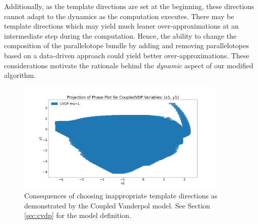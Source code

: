Additionally, as the template directions are set at the beginning, these directions cannot adapt to the dynamics as the computation executes.
%
There may be template directions which may yield much leaner over-approximations at an intermediate step during the computation.
%
Hence, the ability to change the composition of the parallelotope bundle by adding and removing parallelotopes based on a data-driven approach could yield better over-approximations.
%
These considerations motivate the rationale behind the \emph{dynamic} aspect of our modified algorithm.

\begin{figure}[t!]
\centering
\includegraphics[width= 0.9\textwidth]{figures/cvdp20.png}
\caption{Consequences of choosing inappropriate template directions as demonstrated by the Coupled Vanderpol model. See Section \ref{sec:cvdp} for the model definition.}
\label{fig:bloat_cvdp}
\end{figure}

